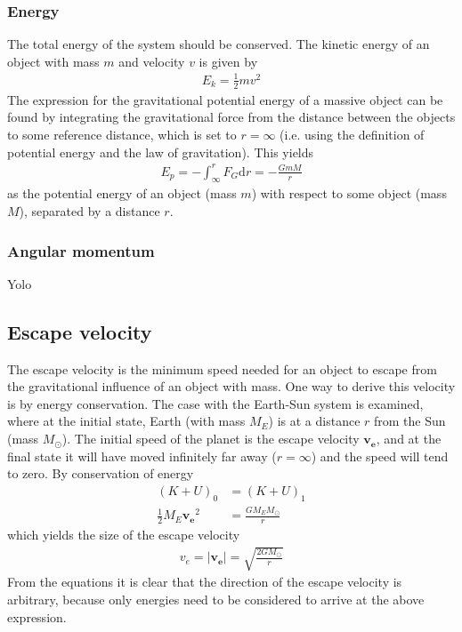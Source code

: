 \documentclass[aps,reprint]{revtex4-1}
\begin{document}
\subsubsection{Energy}
The total energy of the system should be conserved. The kinetic energy of an object with
mass $m$ and velocity $v$ is given by
\begin{align*}
 E_k = \frac{1}{2}m v^2
\end{align*}
The expression for the gravitational potential energy of a massive object can be found by
integrating the gravitational force from the distance between the objects to some reference
distance, which is set to $r = \infty$ (i.e. using the definition of potential energy and the law
of gravitation). This yields
\begin{align*}
 E_p = -\int_\infty^r F_G \text{d} r = -\frac{GmM}{r}
\end{align*}
as the potential energy of an object (mass $m$) with respect to some object (mass $M$),
separated by a distance $r$.
\subsubsection{Angular momentum}
Yolo
\subsection{Escape velocity}
The escape velocity is the minimum speed needed for an object to escape from the
gravitational influence of an object with mass. One way to derive this velocity
is by energy conservation. The case with the Earth-Sun system
is examined, where at the initial state, Earth (with mass $M_E$) is at a
distance $r$ from the Sun (mass $M_\odot$). The
initial speed of the planet is the escape velocity $\mathbf{v_e}$, and at the
final state it will have moved infinitely far away ($r = \infty$) and the speed
will tend to zero. By conservation of energy
\begin{align*}
  (K + U)_0 &= (K + U)_1 \\
  \frac{1}{2} M_E \mathbf{v_e}^2 &= \frac{GM_E M_\odot}{r}
\end{align*}
which yields the size of the escape velocity
\begin{align}
  v_e = |\mathbf{v_e}| = \sqrt{\frac{2GM_\odot}{r}}
\end{align}
From the equations it is clear that the direction of the escape velocity is
arbitrary, because only energies need to be considered to arrive at the above
expression.
\end{document}
